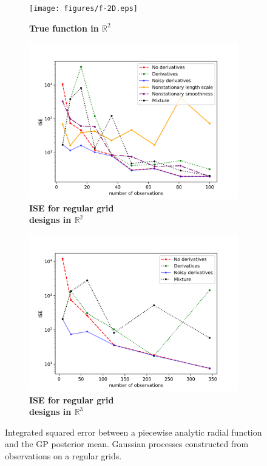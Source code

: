 \documentclass{article}
\newcommand{\R}{\mathbb{R}}
\numberwithin{equation}{section}
\begin{document}
\begin{figure}
		\centering
		\captionsetup{justification=centering}
    \begin{subfigure}[t]{.33\textwidth}
      \centering
      \texttt{[image: figures/f-2D.eps]}
      \caption{\textbf{True function in $\R^2$}}
    \end{subfigure}%
    \begin{subfigure}[t]{.33\textwidth}
      \centering
      \includegraphics[scale=0.38]{figures/regular-2D-all.png}
      \caption{\textbf{ISE for regular grid \\ designs in $\R^2$}}
    \end{subfigure}
    \begin{subfigure}[t]{.33\textwidth}
      \centering
      \includegraphics[scale=0.38]{figures/regular-3D-all.png}
      \caption{\textbf{ISE for regular grid \\ designs in $\R^3$}}
    \end{subfigure}
		\caption{Integrated squared error between a piecewise analytic radial function and the GP posterior mean. Gaussian processes constructed from observations on a regular grids.}
		\label{regular-2D}
\end{figure}
\end{document}
